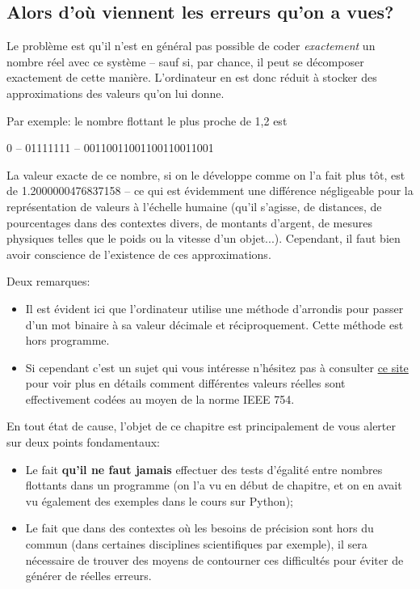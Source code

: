 \documentclass[12pt]{article}
\begin{document}
	\subsection{Alors d'où viennent les erreurs qu'on a vues?}
	Le problème est qu'il n'est en général pas possible de coder \textit{exactement} un nombre réel avec ce système -- sauf si, par chance, il peut se décomposer exactement de cette manière. L'ordinateur en est donc réduit à stocker des approximations des valeurs qu'on lui donne.
	
	Par exemple: le nombre flottant le plus proche de 1,2 est
	\begin{center}
		0 -- 01111111 -- 00110011001100110011001
	\end{center}
	La valeur exacte de ce nombre, si on le développe comme on l'a fait plus tôt, est de 1.2000000476837158 -- ce qui est évidemment une différence négligeable pour la représentation de valeurs à l'échelle humaine (qu'il s'agisse, de distances, de pourcentages dans des contextes divers, de montants d'argent, de mesures physiques telles que le poids ou la vitesse d'un objet...). Cependant, il faut bien avoir conscience de l'existence de ces approximations.
	
	Deux remarques:
	\begin{itemize}
		\item Il est évident ici que l'ordinateur utilise une méthode d'arrondis pour passer d'un mot binaire à sa valeur décimale et réciproquement. Cette méthode est hors programme.
		\item Si cependant c'est un sujet qui vous intéresse n'hésitez pas à consulter  \href{https://www.h-schmidt.net/FloatConverter/IEEE754.html}{ce site} pour voir plus en détails comment différentes valeurs réelles sont effectivement codées au moyen de la norme IEEE 754.
	\end{itemize}
	
	
	En tout état de cause, l'objet de ce chapitre est principalement de vous alerter sur deux points fondamentaux:
	
	\begin{itemize}
		\item Le fait \textbf{qu'il ne faut jamais} effectuer des tests d'égalité entre nombres flottants dans un programme (on l'a vu en début de chapitre, et on en avait vu également des exemples dans le cours sur Python);
		\item Le fait que dans des contextes où les besoins de précision sont hors du commun (dans certaines disciplines scientifiques par exemple), il sera nécessaire de trouver des moyens de contourner ces difficultés pour éviter de générer de réelles erreurs.
	\end{itemize}
	
\end{document}
